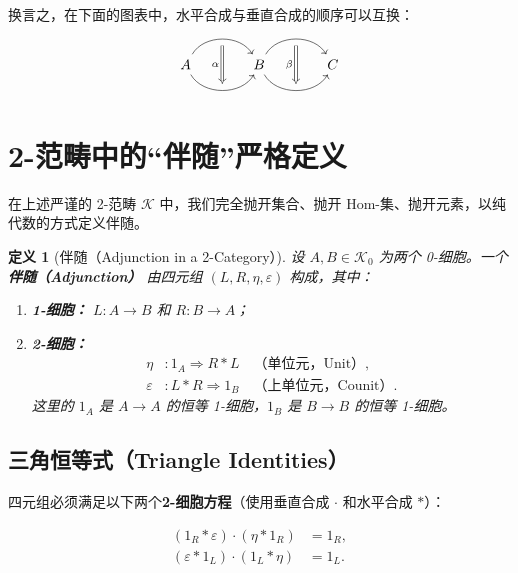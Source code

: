 \documentclass[12pt,a4paper]{ctexart}
\newtheorem{definition}{定义}[section]
\theoremstyle{definition}
\begin{document}
换言之，在下面的图表中，水平合成与垂直合成的顺序可以互换：
\[
\begin{tikzcd}[column sep=large, row sep=large]
A \ar[r, bend left=60, ""{name=U,below}] \ar[r, bend right=60, ""{name=D,above}]
& B \ar[r, bend left=60, ""{name=U2,below}] \ar[r, bend right=60, ""{name=D2,above}]
& C
\arrow[Rightarrow, from=U, to=D, "\alpha"'] 
\arrow[Rightarrow, from=U2, to=D2, "\beta"']
\end{tikzcd}
\]

\section{2-范畴中的“伴随”严格定义}

在上述严谨的 2-范畴 $\mathcal{K}$ 中，我们完全抛开集合、抛开 Hom-集、抛开元素，以纯代数的方式定义伴随。

\begin{definition}[伴随（Adjunction in a 2-Category）]
设 $A, B \in \mathcal{K}_0$ 为两个 0-细胞。一个\textbf{伴随（Adjunction）} 由四元组 $(L, R, \eta, \varepsilon)$ 构成，其中：
\begin{enumerate}[leftmargin=*]
    \item \textbf{1-细胞：} $L: A \to B$ 和 $R: B \to A$；
    \item \textbf{2-细胞：} 
    \begin{align*}
        \eta &: 1_A \Rightarrow R \ast L \quad \text{（单位元，Unit）},\\
        \varepsilon &: L \ast R \Rightarrow 1_B \quad \text{（上单位元，Counit）}.
    \end{align*}
    这里的 $1_A$ 是 $A \to A$ 的恒等 1-细胞，$1_B$ 是 $B \to B$ 的恒等 1-细胞。
\end{enumerate}
\end{definition}

\subsection{三角恒等式（Triangle Identities）}

四元组必须满足以下两个\textbf{2-细胞方程}（使用垂直合成 $\cdot$ 和水平合成 $\ast$）：

\begin{align}
(1_R \ast \varepsilon) \cdot (\eta \ast 1_R) &= 1_R, \label{eq:triangle1}\\[4pt]
(\varepsilon \ast 1_L) \cdot (1_L \ast \eta) &= 1_L. \label{eq:triangle2}
\end{align}
\end{document}
